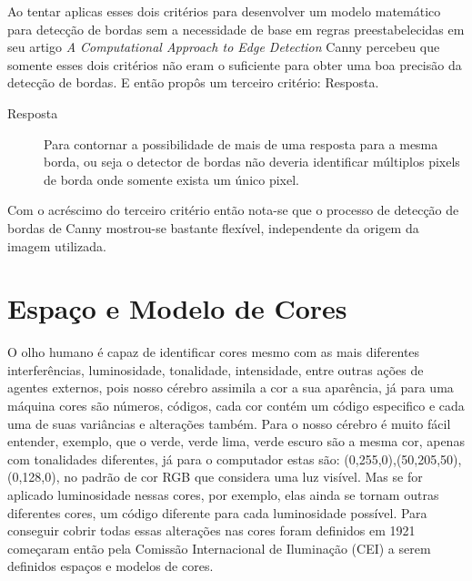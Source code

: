 Ao tentar aplicas esses dois critérios para desenvolver um modelo matemático para detecção de bordas sem a necessidade de base em regras preestabelecidas em seu artigo
\textit{ A Computational Approach to Edge Detection} Canny percebeu que somente esses dois critérios não eram o suficiente para obter uma boa precisão da detecção de bordas. E então propôs um terceiro critério: Resposta.
\begin{description}
	\item[Resposta] Para contornar a possibilidade de mais de uma resposta para a mesma borda, ou seja o detector de bordas não deveria identificar múltiplos pixels de borda onde somente exista um único pixel. \cite{Wangenheim:2014, Canny:1986, Vale:2002}
\end{description}

Com o acréscimo do terceiro critério então nota-se que o processo de detecção de bordas de Canny
mostrou-se bastante flexível, independente da origem da imagem utilizada\cite{Vale:2002}.









\section{Espaço e Modelo de Cores} \label{Sec:Cores}


O olho humano é capaz de identificar cores mesmo com as mais diferentes interferências, luminosidade, tonalidade, intensidade, entre outras ações de agentes externos, pois nosso cérebro assimila a cor a sua aparência, já para uma máquina cores são números, códigos, cada cor contém um código especifico e cada uma de suas variâncias e alterações também. Para o nosso cérebro é muito fácil entender, exemplo, que o verde, verde lima, verde escuro são a mesma cor, apenas com tonalidades diferentes, já para o computador estas são: (0,255,0),(50,205,50),(0,128,0), no padrão de cor RGB que considera uma luz visível. Mas se for aplicado luminosidade nessas cores, por exemplo, elas ainda se tornam outras diferentes cores, um código diferente para cada luminosidade possível. Para conseguir cobrir todas essas alterações nas cores foram definidos em 1921 começaram então pela Comissão Internacional de Iluminação (CEI) a serem definidos espaços e modelos de cores\cite{Souto:2003}.

